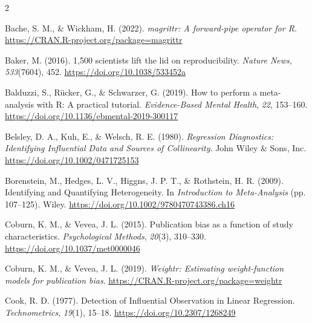 \documentclass[
  bookmarksnumbered]{article}
\newlength{\cslhangindent}
\newlength{\cslentryspacingunit} %
\newenvironment{CSLReferences}[2] %
 {%
  \setlength{\parindent}{0pt}
  \ifodd #1
  \let\oldpar\par
  \def\par{\hangindent=\cslhangindent\oldpar}
  \fi
  \setlength{\parskip}{#2\cslentryspacingunit}
 }%
 {}
\begin{document}
\footnotesize
\begin{multicols}{2}

\hypertarget{refs}{}
\begin{CSLReferences}{1}{0}
\leavevmode{}%
Bache, S. M., \& Wickham, H. (2022). \emph{{magrittr}: A forward-pipe operator for {R}}. \url{https://CRAN.R-project.org/package=magrittr}

\leavevmode{}%
Baker, M. (2016). 1,500 scientists lift the lid on reproducibility. \emph{Nature News}, \emph{533}(7604), 452. \url{https://doi.org/10.1038/533452a}

\leavevmode{}%
Balduzzi, S., Rücker, G., \& Schwarzer, G. (2019). How to perform a meta-analysis with {R}: A practical tutorial. \emph{Evidence-Based Mental Health}, \emph{22}, 153--160. \url{https://doi.org/10.1136/ebmental-2019-300117}

\leavevmode{}%
Belsley, D. A., Kuh, E., \& Welsch, R. E. (1980). \emph{Regression {Diagnostics}: {Identifying Influential Data} and {Sources} of {Collinearity}}. {John Wiley \& Sons, Inc.} \url{https://doi.org/10.1002/0471725153}

\leavevmode{}%
Borenstein, M., Hedges, L. V., Higgns, J. P. T., \& Rothstein, H. R. (2009). Identifying and {Quantifying Heterogeneity}. In \emph{Introduction to {Meta}-{Analysis}} (pp. 107--125). Wiley. \url{https://doi.org/10.1002/9780470743386.ch16}

\leavevmode{}%
Coburn, K. M., \& Vevea, J. L. (2015). Publication bias as a function of study characteristics. \emph{Psychological Methods}, \emph{20}(3), 310--330. \url{https://doi.org/10.1037/met0000046}

\leavevmode{}%
Coburn, K. M., \& Vevea, J. L. (2019). \emph{Weightr: Estimating weight-function models for publication bias}. \url{https://CRAN.R-project.org/package=weightr}

\leavevmode{}%
Cook, R. D. (1977). Detection of {Influential Observation} in {Linear Regression}. \emph{Technometrics}, \emph{19}(1), 15--18. \url{https://doi.org/10.2307/1268249}


\end{CSLReferences}
\end{multicols}
\end{document}
